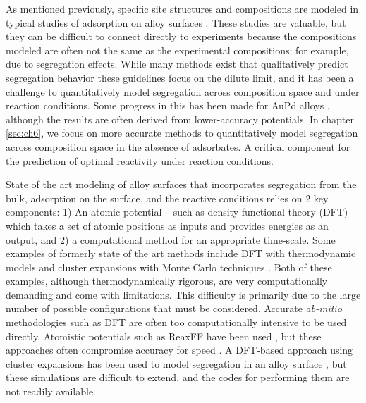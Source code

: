 \documentclass[12pt,oneside]{cmuthesis}
\begin{document}
As mentioned previously, specific site structures and compositions are modeled in typical studies of adsorption on alloy surfaces \cite{alfonso-2003-densit-funct,greeley-2009-combin-densit}. These studies are valuable, but they can be difficult to connect directly to experiments because the compositions modeled are often not the same as the experimental compositions; for example, due to segregation effects. While many methods exist that qualitatively predict segregation behavior \cite{ruban-1999-calcul,skriver-2000-steps,nilekar-2009-surfac,han-2009-step-decor} these guidelines focus on the dilute limit, and it has been a challenge to quantitatively model segregation across composition space and under reaction conditions. Some progress in this has been made for AuPd alloys \cite{soto-verdugo-2007-segreg-at,atanasov-2009-equil-order,creuze-2015-surfac-segreg}, although the results are often derived from lower-accuracy potentials. In chapter \ref{sec:ch6}, we focus on more accurate methods to quantitatively model segregation across composition space in the absence of adsorbates. A critical component for the prediction of optimal reactivity under reaction conditions.

State of the art modeling of alloy surfaces that incorporates segregation from the bulk, adsorption on the surface, and the reactive conditions relies on 2 key components: 1) An atomic potential -- such as density functional theory (DFT) -- which takes a set of atomic positions as inputs and provides energies as an output, and 2) a computational method for an appropriate time-scale. Some examples of formerly state of the art methods include DFT with thermodynamic models \cite{kitchin-2008-alloy} and cluster expansions with Monte Carlo techniques \cite{han-2005-surfac-segreg,mei-2009-hydrog-acety}. Both of these examples, although thermodynamically rigorous, are very computationally demanding and come with limitations. This difficulty is primarily due to the large number of possible configurations that must be considered. Accurate \emph{ab-initio} methodologies such as DFT are often too computationally intensive to be used directly. Atomistic potentials such as ReaxFF have been used \cite{kwak-2012-ab-initio}, but these approaches often compromise accuracy for speed \cite{boes-2016-neural-networ}. A DFT-based approach using cluster expansions has been used to model segregation in an alloy surface \cite{han-2005-surfac-segreg,welker-2010-predic-segreg}, but these simulations are difficult to extend, and the codes for performing them are not readily available.
\end{document}
